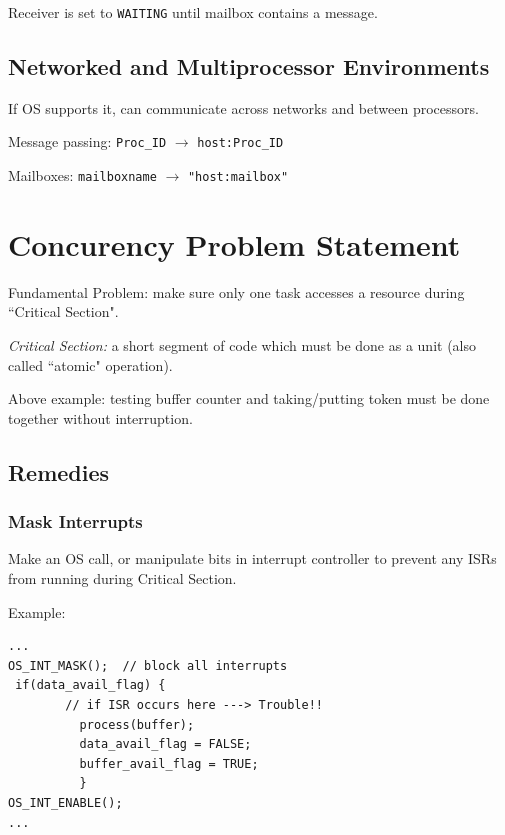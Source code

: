 Receiver is set to {\tt WAITING} until mailbox contains a message.

\subsection{Networked and Multiprocessor Environments}
If OS supports it, can communicate across networks and between processors.

Message passing:    {\tt Proc\_ID} $\to$ {\tt host:Proc\_ID}

Mailboxes:     {\tt mailboxname} $\to$ {\tt "host:mailbox" }




\section{Concurency Problem Statement}

Fundamental Problem: make sure only one task accesses a resource
during ``Critical Section".

{\it Critical Section: } a short segment of code which must be done
as a unit (also called ``atomic" operation).

Above example: testing buffer counter and taking/putting token
must be done together without interruption.



\subsection{Remedies}

\subsubsection{ Mask Interrupts}

Make an OS call, or manipulate bits in interrupt controller
to prevent any ISRs from running during Critical Section.

Example:
\begin{verbatim}
...
OS_INT_MASK();  // block all interrupts
 if(data_avail_flag) {
        // if ISR occurs here ---> Trouble!!
          process(buffer);
          data_avail_flag = FALSE;
          buffer_avail_flag = TRUE;
          }
OS_INT_ENABLE();
...
\end{verbatim}

